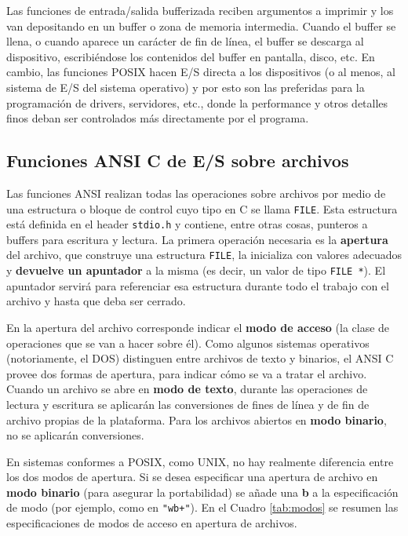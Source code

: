Las funciones de entrada/salida bufferizada reciben argumentos a imprimir y
los van depositando en un buffer o zona de memoria intermedia.
Cuando el buffer se llena, o cuando aparece un carácter de fin de línea, el
buffer se descarga al dispositivo, escribiéndose los contenidos del buffer en
pantalla, disco, etc. En cambio, las funciones POSIX hacen E/S 
directa a los dispositivos (o al menos, al sistema de E/S del sistema
operativo) y por esto son las preferidas para la programación de drivers,
servidores, etc., donde la performance y otros detalles finos deban ser
controlados más directamente por el programa.

\subsection{Funciones ANSI C de E/S sobre archivos}
\label{subsec:esarchivosansic}
Las funciones ANSI realizan todas las operaciones sobre archivos por medio de
una estructura o bloque de control cuyo tipo en C se llama \lstinline{FILE}. Esta
estructura está definida en el header \lstinline{stdio.h} y contiene, entre otras cosas,
punteros a buffers para escritura y lectura. La primera operación necesaria es
la \textbf{apertura} del archivo, que construye una estructura \lstinline{FILE}, la inicializa con
valores adecuados y \textbf{devuelve un apuntador} a la misma (es decir, un valor de tipo \lstinline{FILE *}). El apuntador servirá para
referenciar esa estructura durante todo el trabajo con el archivo y hasta que deba ser
cerrado.

En la apertura del archivo corresponde indicar el \textbf{modo de acceso} (la clase de
operaciones que se van a hacer sobre él). Como algunos sistemas operativos
(notoriamente, el DOS) distinguen entre archivos de texto y binarios, el ANSI C
provee dos formas de apertura, para indicar cómo se va a tratar el archivo.
Cuando un archivo se abre en \textbf{modo de texto}, durante las operaciones de lectura
y escritura se aplicarán las conversiones de fines de línea y de fin de archivo
propias de la plataforma. Para los archivos abiertos en \textbf{modo binario}, no se
aplicarán conversiones.

En sistemas conformes a POSIX, como UNIX, no hay realmente diferencia entre los
dos modos de apertura. Si se desea especificar una apertura de archivo en \textbf{modo
binario} (para asegurar la portabilidad) se añade una \textbf{b} a la especificación de
modo (por ejemplo, como en \lstinline{"wb+"}). En el Cuadro \ref{tab:modos} se resumen las especificaciones de modos de acceso en apertura de archivos. 


